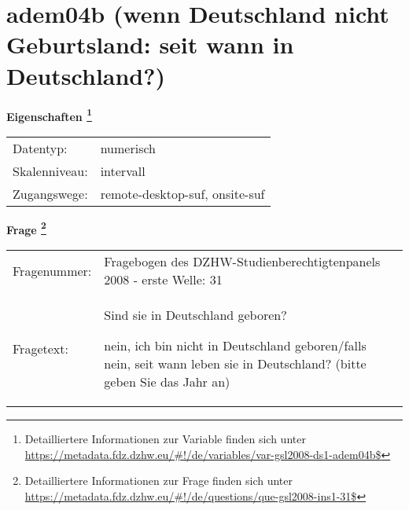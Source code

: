 
    \setcounter{footnote}{0}

    \vspace*{-1.8cm}
	\section{adem04b (wenn Deutschland nicht Geburtsland: seit wann in Deutschland?)}
	\label{section:adem04b}



    \vspace*{0.5cm}
    \noindent\textbf{Eigenschaften
	\footnote{Detailliertere Informationen zur Variable finden sich unter
		\url{https://metadata.fdz.dzhw.eu/\#!/de/variables/var-gsl2008-ds1-adem04b$}}}\\
	\begin{tabularx}{\hsize}{@{}lX}
	Datentyp: & numerisch \\
	Skalenniveau: & intervall \\
	Zugangswege: &
	  remote-desktop-suf, 
	  onsite-suf
 \\
    \end{tabularx}



				\vspace*{0.5cm}
                \noindent\textbf{Frage
	                \footnote{Detailliertere Informationen zur Frage finden sich unter
		              \url{https://metadata.fdz.dzhw.eu/\#!/de/questions/que-gsl2008-ins1-31$}}}\\
				\begin{tabularx}{\hsize}{@{}lX}
					Fragenummer: &
					  Fragebogen des DZHW-Studienberechtigtenpanels 2008 - erste Welle:
					  31
 \\
					Fragetext: & Sind sie in Deutschland geboren?\par  nein, ich bin nicht in Deutschland geboren/falls nein, seit wann leben sie in Deutschland? (bitte geben Sie das Jahr an) \\
				\end{tabularx}





